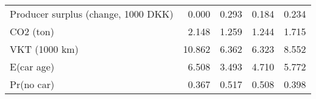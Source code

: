 \begin{tabular}{lrrrr}
     Producer surplus (change, 1000 DKK) &        0.000&        0.293&        0.184&        0.234 \\ 
                               CO2 (ton) &        2.148&        1.259&        1.244&        1.715 \\ 
                           VKT (1000 km) &       10.862&        6.362&        6.323&        8.552 \\ 
                              E(car age) &        6.508&        3.493&        4.710&        5.772 \\ 
                              Pr(no car) &        0.367&        0.517&        0.508&        0.398 \\ 
\bottomrule 
\end{tabular}
